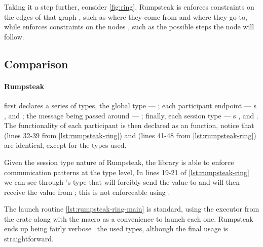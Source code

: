 Taking it a step further, consider \autoref{fig:ring},
Rumpsteak is enforces constraints on the edges of that graph ,
such as where they come from and where they go to,
while  enforces constraints on the nodes ,
such as the possible steps the node will follow.

\subsection{Comparison}

\paragraph{Rumpsteak} first declares a series of types, the global type --- ;
each participant endpoint --- s ,  and ;
the message being passed around --- ;
finally, each session type --- s ,  and .
The functionality of each participant is then declared as an  function,
notice that  (lines 32-39 from \autoref{lst:rumpsteak-ring})
and  (lines 41-48 from \autoref{lst:rumpsteak-ring}) are identical, except for the types used.

Given the session type nature of Rumpsteak, the library is able to enforce communication patterns at the type level,
In lines 19-21 of \autoref{lst:rumpsteak-ring} we can see through 's type that
 will forcibly send the value to  and will then receive the value from ;
this is not enforceable using .

The launch routine \autoref{lst:rumpsteak-ring-main} is standard,
using the executor from the  crate along with the  macro as a convenience to launch each one.
Rumpsteak ends up being fairly verbose \wrt~the used types,
although the final usage  is straightforward.

